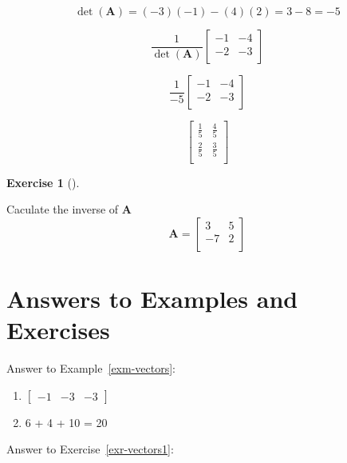 \documentclass[
  letterpaper,
]{book}
\providecommand{\tightlist}{%
  \setlength{\itemsep}{0pt}\setlength{\parskip}{0pt}}\usepackage{longtable,booktabs,array}
\theoremstyle{definition}
\theoremstyle{definition}
\theoremstyle{plain}
\theoremstyle{definition}
\newtheorem{exercise}{Exercise}[chapter]
\theoremstyle{plain}
\theoremstyle{plain}
\theoremstyle{remark}
\begin{document}
\[\det(\mathbf{A}) = (-3)(-1) - (4)(2) = 3 - 8  = -5\]

\[\frac{1}{\det(\mathbf{A})} \begin{bmatrix}
            -1 & -4\\
            -2 & -3\\
        \end{bmatrix}\]

\[\frac{1}{-5} \begin{bmatrix}
            -1 & -4\\
            -2 & -3\\
        \end{bmatrix}\]

\[\begin{bmatrix}
            \frac{1}{5} & \frac{4}{5}\\
            \frac{2}{5} & \frac{3}{5}\\
        \end{bmatrix}\]

\leavevmode{}%
\begin{exercise}[]\label{exr-calcinverse}

Caculate the inverse of \(\mathbf{A}\) \[\mathbf{A} = \begin{bmatrix}
            3 & 5\\
            -7 & 2\\
        \end{bmatrix}\]

\end{exercise}

\hypertarget{answers-to-examples-and-exercises-1}{%
\section*{Answers to Examples and
Exercises}\label{answers-to-examples-and-exercises-1}}

Answer to Example~\ref{exm-vectors}:

\begin{enumerate}
\def\labelenumi{\arabic{enumi}.}
\tightlist
\item
  \(\begin{bmatrix} -1 &-3&-3 \end{bmatrix}\)
\item
  6 + 4 + 10 = 20
\end{enumerate}

Answer to Exercise~\ref{exr-vectors1}:
\end{document}
